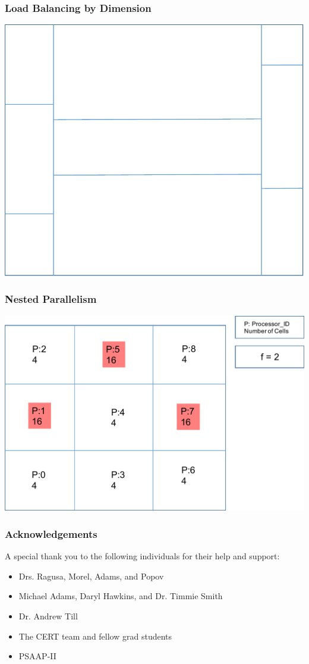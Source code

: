 \documentclass[compress]{beamer}
\begin{document}
\begin{frame}[t]\frametitle{Load Balancing by Dimension}
\centering
\includegraphics[scale=0.5]{figures/column_moves.pdf}
\end{frame}


\begin{frame}[t]\frametitle{Nested Parallelism}
\centering
\includegraphics[scale=0.5]{figures/initial_setup.pdf}
\end{frame}

\begin{frame}[t]\frametitle{Acknowledgements}
\begin{block}{}
A special thank you to the following individuals for their help and support:
\begin{itemize}
\item Drs. Ragusa, Morel, Adams, and Popov
\item Michael Adams, Daryl Hawkins, and Dr. Timmie Smith
\item Dr. Andrew Till
\item The CERT team and fellow grad students
\item PSAAP-II 
\end{itemize}
\end{block}
\end{frame}
\end{document}
